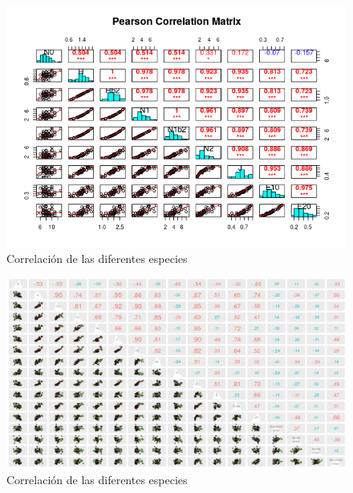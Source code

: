 \documentclass[11pt,]{article}
\begin{document}
\begin{figure}
\centering
\includegraphics[width=1.20000\textwidth]{Matriz_correlacion_Pearson.png}
\caption{Correlación de las diferentes especies\label{diversidad}}
\end{figure}

\begin{figure}
\centering
\includegraphics[width=1.10000\textwidth]{matriz_correlacion_suelo_abun_riq_spearman.png}
\caption{Correlación de las diferentes especies\label{ambiente}}
\end{figure}
\end{document}
